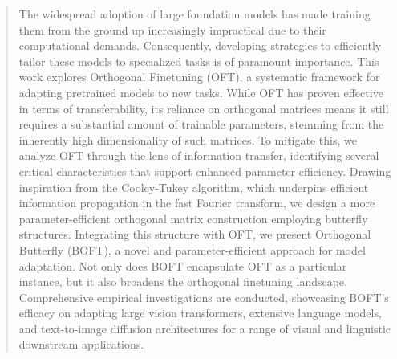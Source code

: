 \begin{abstract}
The widespread adoption of large foundation models has made training them from the ground up increasingly impractical due to their computational demands. Consequently, developing strategies to efficiently tailor these models to specialized tasks is of paramount importance. This work explores Orthogonal Finetuning (OFT), a systematic framework for adapting pretrained models to new tasks. While OFT has proven effective in terms of transferability, its reliance on orthogonal matrices means it still requires a substantial amount of trainable parameters, stemming from the inherently high dimensionality of such matrices. To mitigate this, we analyze OFT through the lens of information transfer, identifying several critical characteristics that support enhanced parameter-efficiency. Drawing inspiration from the Cooley-Tukey algorithm, which underpins efficient information propagation in the fast Fourier transform, we design a more parameter-efficient orthogonal matrix construction employing butterfly structures. Integrating this structure with OFT, we present Orthogonal Butterfly (BOFT), a novel and parameter-efficient approach for model adaptation. Not only does BOFT encapsulate OFT as a particular instance, but it also broadens the orthogonal finetuning landscape. Comprehensive empirical investigations are conducted, showcasing BOFT’s efficacy on adapting large vision transformers, extensive language models, and text-to-image diffusion architectures for a range of visual and linguistic downstream applications.
\end{abstract}